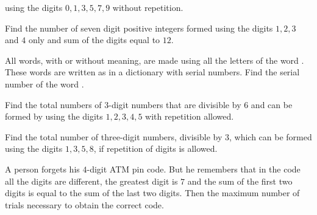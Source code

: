   using the digits $0, 1, 3, 5, 7, 9$ without repetition.
\item Find the number of seven digit positive integers formed using the digits $1, 2, 3$ and $4$ only and
  sum of the digits equal to $12$.
\item All words, with or without meaning, are made using all the letters of the word . These
  words are written as in a dictionary with serial numbers. Find the serial number of the
  word .
\item Find the total numbers of $3$-digit numbers that are divisible by $6$ and can be formed by using the
  digits $1, 2, 3, 4, 5$ with repetition allowed.
\item Find the total number of three-digit numbers, divisible by $3$, which can be formed using the digits
  $1, 3, 5, 8$, if repetition of digits is allowed.
\item A person forgets his $4$-digit ATM pin code. But he remembers that in the code all the digits are
  different, the greatest digit is $7$ and the sum of the first two digits is equal to the sum of the last
  two digits. Then the maximum number of trials necessary to obtain the correct code.
\stopitemize
